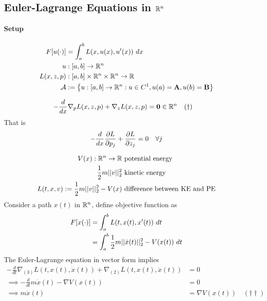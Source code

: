 \documentclass{article}
\begin{document}
	\subsection{Euler-Lagrange Equations in $\mathbb{R}^n$}
	\paragraph{Setup}
	\begin{align}
		F[u(\cdot)] &= \int_a^b L(x, u(x), u'(x))\ dx \\
		u &: [a, b] \to \mathbb{R}^n \\
		L(x, z, p) &: [a, b] \times \mathbb{R}^n \times \mathbb{R}^n \to \mathbb{R} \\
		\mathcal{{A}} &:= \left\{
			u: [a, b] \to \mathbb{R}^n: u \in C^1, u(a) = \textbf{A}, u(b) = \textbf{B}
		\right\}
	\end{align}

	\begin{theorem}
		\begin{align}
			- \frac{d}{dx} \nabla_p L(x, z, p) + \nabla_z L(x, z, p) &= \textbf{0} \in \mathbb{R}^n \quad (\dagger)
		\end{align}
		That is
		\begin{align}
			- \frac{d}{dx}\frac{\partial{L}}{\partial{p_j}} + \frac{\partial{L}}{\partial{z_j}} = 0\quad \forall j
		\end{align}
	\end{theorem}
	
	\begin{example}
		\begin{align}
			V(x): \mathbb{R}^n \to \mathbb{R} &\text{{ potential energy}} \\
			\frac{1}{2} m \vert \vert {v} \vert \vert_2^2 &\text{{ kinetic energy}} \\
			L(t, x, v):= \frac{1}{2} m \vert \vert {v} \vert \vert_2^2 - V(x) &\text{{ difference between KE and PE}}
		\end{align}
		Consider a path $x(t)$ in $\mathbb{R}^n$, define objective function as
		\begin{align}
			F[x(\cdot)] &= \int_a^b L(t, x(t), x'(t))\ dt \\
			&= \int_a^b \frac{1}{2} m \vert \vert {\dot{x}(t)} \vert \vert_2^2 - V(x(t))\ dt
		\end{align}
		The Euler-Lagrange equation in vector form implies
		\begin{align}
			- \frac{d}{dt} \nabla_{(3)} L(t, x(t), \dot{x}(t))
			+ \nabla_{(2)} L(t, x(t), \dot{x}(t)) &= 0 \\
			\implies - \frac{d}{dt} m \dot{x}(t) - \nabla V(x(t)) &= 0 \\
			\implies m \ddot{x}(t) &= \nabla V(x(t))\quad (\dagger \dagger)
		\end{align}
	\end{example}
	
\end{document}
